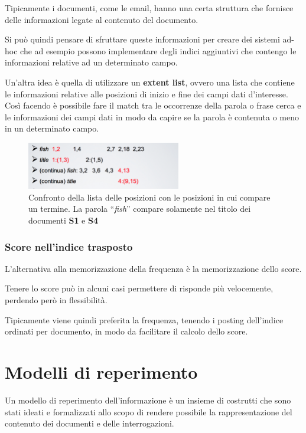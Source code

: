 Tipicamente i documenti, come le email, hanno una certa struttura che fornisce delle informazioni legate al contenuto del documento.

Si può quindi pensare di sfruttare queste informazioni per creare dei sistemi ad-hoc che ad esempio possono implementare degli indici aggiuntivi che contengo le informazioni relative ad un determinato campo.

Un'altra idea è quella di utilizzare un \textbf{extent list}, ovvero una lista che contiene le informazioni relative alle posizioni di inizio e fine dei campi dati d'interesse.
Così facendo è possibile fare il match tra le occorrenze della parola o frase cerca e le informazioni dei campi dati in modo da capire se la parola è contenuta o meno in un determinato campo.

\begin{figure}[htbp]
	\centering
	\includegraphics[width=0.6\textwidth]{./images/l7-titoli}
	\caption{Confronto della lista delle posizioni con le posizioni in cui compare un termine. La parola ``\textit{fish}'' compare solamente nel titolo dei documenti \textbf{S1} e \textbf{S4}}
\end{figure}

\subsection{Score nell'indice trasposto}

L'alternativa alla memorizzazione della frequenza è la memorizzazione dello score. 

Tenere lo score può in alcuni casi permettere di risponde più velocemente, perdendo però in flessibilità.

Tipicamente viene quindi preferita la frequenza, tenendo i posting dell'indice ordinati per documento, in modo da facilitare il calcolo dello score.

\chapter{Modelli di reperimento}

Un modello di reperimento dell'informazione è un insieme di costrutti che sono stati ideati e formalizzati allo scopo di rendere possibile la rappresentazione del contenuto dei documenti e delle interrogazioni.

